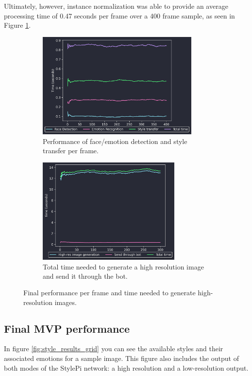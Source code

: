 Ultimately, however, instance normalization was able to provide an average processing time of 0.47 seconds per frame over a 400 frame sample, as seen in Figure \ref{fig:finalFPS}.

\begin{figure}[h]
    \centering
    \begin{subfigure}[t]{0.45\textwidth}
        \centering
        \includegraphics[height = 5.3cm]{resources/finalFPS.png}
        \caption{Performance of face/emotion detection and style transfer per frame.}\label{fig:finalFPS}
    \end{subfigure}
    \begin{subfigure}[t]{0.45\textwidth}
        \centering
        \includegraphics[height =5.3cm]{resources/result_generation_time.png}
        \caption{Total time needed to generate a high resolution image and send it through the bot.}
        \label{fig:result_generation_time}
    \end{subfigure}
    \caption{Final performance per frame and time needed to generate high-resolution images.}\label{fig:final_results_big_fig}
\end{figure}

\subsection{Final MVP performance}

In figure \ref{fig:style_results_grid} you can see the available styles and their associated emotions for a sample image. This figure also includes the output of both modes of the StylePi network: a high resolution and a low-resolution output.

